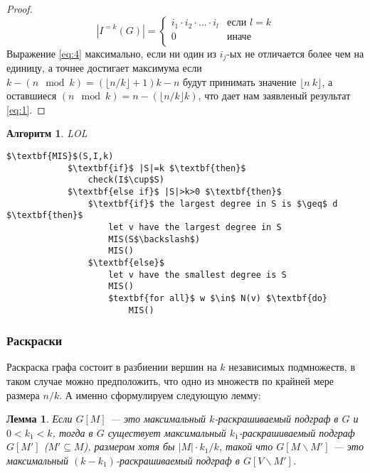 \documentclass[12pt]{article}
\newtheorem{lemma}{Лемма}
\newtheorem{algorithm}{Алгоритм}
\begin{document}
\begin{proof}
	\begin{equation}\label{eq:4}
	    \left| I^{=k}\left(G\right) \right| = \begin{cases}
	        i_1 \cdot i_2 \cdot \dotsc \cdot i_l & \text{если } l = k
	        \\
	        0 & \text{иначе}
	        \\
	    \end{cases}
	\end{equation}
	Выражение \eqref{eq:4} максимально, если ни один из $i_j$-ых не отличается более чем на единицу, а точнее достигает максимума если $k - \left(n \mod k\right) = \left(\lfloor n / k \rfloor + 1\right)k - n$ будут принимать значение $\lfloor n \ k \rfloor$, а оставшиеся $\left(n \mod k\right) = n - \left(\lfloor n/k \rfloor k\right)$, что дает нам заявленый результат \eqref{eq:1}.
\end{proof}
\begin{algorithm}LOL
    \begin{lstlisting}[mathescape=true]
        $\textbf{MIS}$(S,I,k)
            $\textbf{if}$ |S|=k $\textbf{then}$
                check(I$\cup$S)
            $\textbf{else if}$ |S|>k>0 $\textbf{then}$
            	$\textbf{if}$ the largest degree in S is $\geq$ d $\textbf{then}$
            		let v have the largest degree in S
            		MIS(S$\backslash$)
            		MIS()
            	$\textbf{else}$
            		let v have the smallest degree is S
            		MIS()
            		$textbf{for all}$ w $\in$ N(v) $\textbf{do}
            			MIS()
    \end{lstlisting}
\end{algorithm}
\subsubsection{Раскраски}
Раскраска графа состоит в разбиении вершин на $k$ независимых подмножеств, в таком случае можно предположить, что одно из множеств по крайней мере размера $n/k$. А именно сформулируем следующую лемму:
\begin{lemma}
Если $G\left[M\right]$ --- это максимальный $k$-раскрашиваемый подграф в $G$ и $0 < k_1 < k$, тогда в $G$ существует максимальный $k_1$-раскрашиваемый подграф $G\left[M'\right]$ ($M' \subseteq M$), размером хотя бы $\left|M\right|\cdot k_1/k$, такой что $G\left[M \backslash M'\right]$ --- это максимальный $\left(k - k_1\right)$-раскрашиваемый подграф в $G\left[V \backslash M'\right]$.
\end{lemma}
\end{document}
